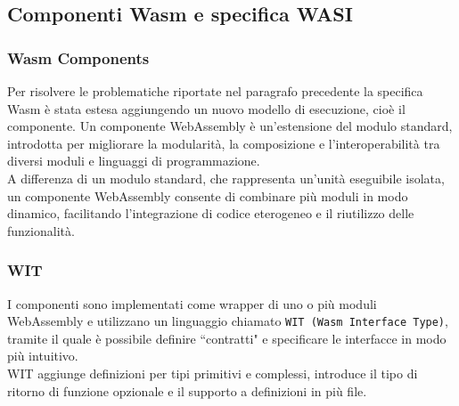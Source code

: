 \subsection{Componenti Wasm e specifica WASI}

\subsubsection{Wasm Components}
\label{sec:wasm_components}

Per risolvere le problematiche riportate nel paragrafo precedente la specifica Wasm è stata estesa aggiungendo un nuovo modello di esecuzione, cioè il componente. Un componente WebAssembly\cite{webassembly_component_model} è un'estensione del modulo standard, introdotta per migliorare la modularità, la composizione e l'interoperabilità tra diversi moduli e linguaggi di programmazione.\\
A differenza di un modulo standard, che rappresenta un'unità eseguibile isolata, un componente WebAssembly consente di combinare più moduli in modo dinamico, facilitando l'integrazione di codice eterogeneo e il riutilizzo delle funzionalità.

\subsubsection{WIT}

I componenti sono implementati come wrapper di uno o più moduli WebAssembly e utilizzano un linguaggio chiamato \texttt{WIT (Wasm Interface Type)}, tramite il quale è possibile definire ``contratti" e specificare le interfacce in modo più intuitivo.\\
WIT aggiunge definizioni per tipi primitivi e complessi, introduce il tipo di ritorno di funzione opzionale e il supporto a definizioni in più file.

